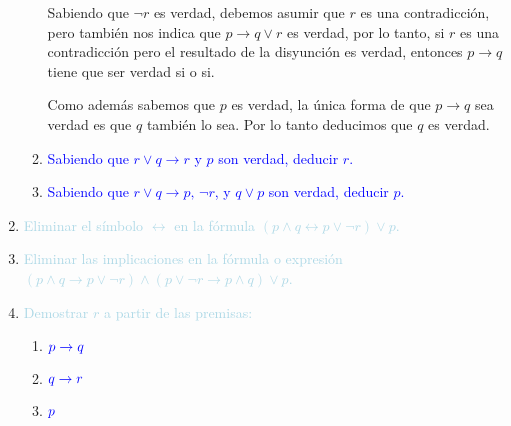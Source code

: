 \documentclass[12pt]{article}
\newcommand{\lb}[1]{\textcolor{lightblue}{#1}}
\newcommand{\db}[1]{\textcolor{blue}{#1}}
\begin{document}
\begin{enumerate}[label=\color{red}\textbf{\arabic*)}, leftmargin=*]
\begin{enumerate}[label=\color{red}\alph*)]
            Sabiendo que $\neg r$ es verdad, debemos asumir que $r$ es una contradicción, pero también nos indica que $p\to q\vee r$ es verdad, por lo tanto, si $r$ es una contradicción pero el resultado de la disyunción es verdad, entonces $p\to q$ tiene que ser verdad si o si.
            
            Como además sabemos que $p$ es verdad, la única forma de que $p\to q$ sea verdad es que $q$ también lo sea. Por lo tanto deducimos que $q$ es verdad.
            \item \db{Sabiendo que $r\vee q\to r$ y $p$ son verdad, deducir $r$.}
            
            
            \item \db{Sabiendo que $r\vee q\to p,\,\neg r$, y $q\vee p$ son verdad, deducir $p$.}
      \end{enumerate}
      \item \lb{Eliminar el símbolo $\longleftrightarrow$ en la fórmula $(p\wedge q\leftrightarrow p\vee\neg r)\vee p$.}
      \item \lb{Eliminar las implicaciones en la fórmula o expresión $(p\wedge q\to p\vee\neg r)\wedge(p\vee\neg r\to p\wedge q)\vee p$.}
      \item \lb{Demostrar $r$ a partir de las premisas:}
      \begin{enumerate}[label=\color{red}\alph*)]
            \item $\db{p\to q}$
            \item $\db{q\to r}$
            \item $\db{p}$
      \end{enumerate}
      

\end{enumerate}
\end{document}
